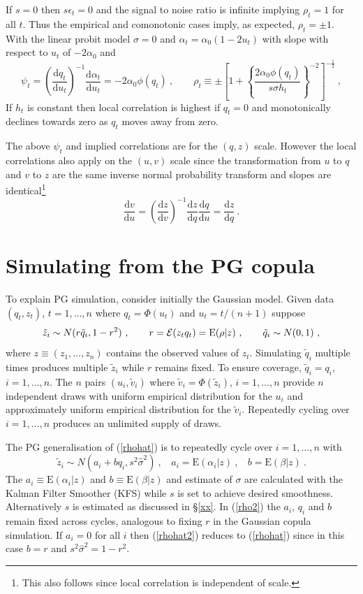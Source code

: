 \documentclass[authoryear]{elsarticle}
\newcommand{\E}{\mathrm{E}}
\newcommand{\eps}{\epsilon}
\newcommand{\Ex}{{\cal E}}
\newcommand{\de}{\mathrm{d}}
\newcommand{\eref}[1]{(\ref{#1})}
\newcommand{\sref}[1]{\S\ref{#1}}
\newcommand{\cq}{\ , \qquad}
\newcommand{\be}[1]{\begin{equation}\label{#1}}
\newcommand{\ee}{\end{equation}}
\begin{document}
If $s=0$ then $s\eps_t=0$  and  the signal to noise ratio is infinite implying $\rho_t=1$ for all $t$.  Thus the empirical and comonotonic cases imply, as expected,  $\rho_t=\pm 1$.   With the linear probit model $\sigma=0$ and $\alpha_t=\alpha_0(1-2u_t)$ with slope with respect to $u_t$ of $-2\alpha_0$ and
\be{normslope2}
\psi_t =  \left( \frac{\de q_t}{\de u_t}\right)^{-1}\frac{\de \alpha_t}{\de u_t}  =
 -2\alpha_0\phi(q_t)\cq  \rho_t\equiv\pm\left[1+\left\{\frac{2\alpha_0\phi(q_t)}{s\sigma h_t}\right\}^{-2}\right]^{-\frac{1}{2}}\ ,
\ee
If $h_t$ is constant then  local correlation is  highest if  $q_t=0$ and monotonically declines towards zero as $q_t$ moves away from zero. 

The above $\psi_t$ and implied correlations are for the $(q,z)$ scale.  However the local correlations also apply on the $(u,v)$ scale since the transformation from $u$ to $q$ and $v$ to $z$ are the same inverse normal probability transform and slopes are identical\footnote{This also follows since local correlation is independent of scale.}
$$
\frac{\de v}{\de u} =\left(\frac{\de z}{\de v}\right)^{-1} \frac{\de z}{\de q} \frac{\de q}{\de u} = \frac{\de z}{\de q}\ .
$$ 
\section{Simulating from the PG copula} 

To explain PG simulation, consider initially  the Gaussian model.   Given data $(q_t,z_t)$, $t=1,\ldots,n$ where
$q_t=\Phi(u_t)$ and $u_t=t/(n+1)$ suppose 
\be{rhohat}
\tilde z_i\sim N(r \tilde q_i,1-r^2)\cq r=\Ex(z_tq_t) = \E(\rho|  z)\cq \tilde q_i\sim N(0,1)\ ,
\ee
where $z\equiv(z_1,\ldots,z_n)$ contains the observed values of $z_t$.
Simulating $\tilde q_i$ multiple times produces multiple $\tilde z_i$ while $r$  remains fixed.   To ensure  coverage, $\tilde q_i=q_i$,  $i=1,\ldots, n$.   The  $n$ pairs $(u_i, \tilde v_i)$ where $\tilde v_i=\Phi(\tilde z_i)$, $i=1,\ldots,n$  provide $n$ independent draws with   uniform  empirical distribution for the $u_i$ and approximately uniform empirical distribution for the $\tilde v_i$.   Repeatedly cycling over $i=1,\ldots,n$  produces an unlimited supply of  draws.

The PG generalisation of \eref{rhohat} is to repeatedly cycle over  $i=1,\ldots,n$ with 
\be{rhohat2}
\tilde z_i\sim N(a_i+bq_i, s^2\hat\sigma^2)\ , \ \ \ \  a_i=\E(\alpha_i|  z)\ , \ \ \ \ b=\E(\beta|  z)\ .
\ee
The $a_i\equiv\E(\alpha_i|z)$ and $b\equiv\E(\beta|z)$ and estimate of $\sigma$ are calculated with the Kalman Filter Smoother (KFS)  \citep{DeJong:91a} while $s$ is set to achieve desired smoothness.  Alternatively $s$ is estimated as discussed in \sref{xx}.  In  \eref{rho2} the $a_i$, $q_i$  and $b$ remain fixed across cycles, analogous to fixing $r$  in the  Gaussian copula simulation.  If $a_i=0$ for all $i$ then \eref{rhohat2} reduces to \eref{rhohat} since in this case $b=r$ and $s^2\hat\sigma^2=1-r^2$. 
\end{document}
